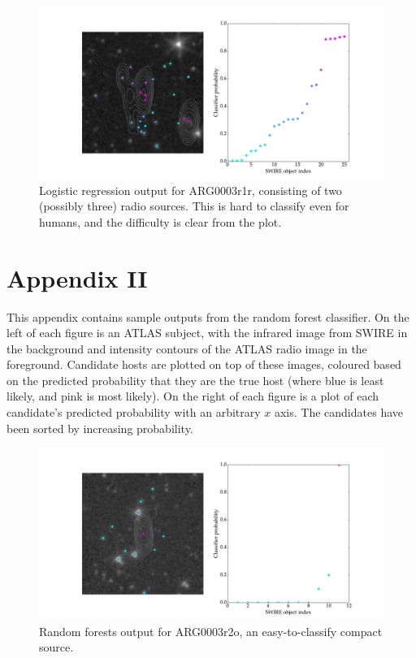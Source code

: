 \documentclass[a4paper]{article}
\begin{document}
    \begin{figure}[!ht]
      \centering
      \includegraphics[width=\linewidth]{images/ARG0003r1r_lr.pdf}
      \caption{Logistic regression output for ARG0003r1r, consisting of two (possibly three) radio sources. This is hard to classify even for humans, and the difficulty is clear from the plot.}
      \label{fig:ARG0003r1r_lr}
    \end{figure}

  \newpage
  \section*{Appendix II}

    This appendix contains sample outputs from the random forest classifier. On the left of each figure is an ATLAS subject, with the infrared image from SWIRE in the background and intensity contours of the ATLAS radio image in the foreground. Candidate hosts are plotted on top of these images, coloured based on the predicted probability that they are the true host (where blue is least likely, and pink is most likely). On the right of each figure is a plot of each candidate's predicted probability with an arbitrary $x$ axis. The candidates have been sorted by increasing probability.

    \begin{figure}[!ht]
      \centering
      \includegraphics[width=\linewidth]{images/ARG0003r2o_rf.pdf}
      \caption{Random forests output for ARG0003r2o, an easy-to-classify compact source.}
      \label{fig:ARG0003r2o_rf}
    \end{figure}
\end{document}
